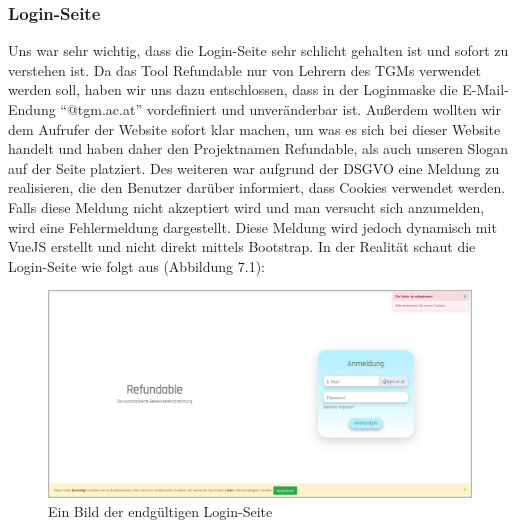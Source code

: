 \subsubsection{Login-Seite}
Uns war sehr wichtig, dass die Login-Seite sehr schlicht gehalten ist und sofort zu verstehen ist. Da das Tool Refundable nur von Lehrern des TGMs verwendet werden soll, haben wir uns dazu entschlossen, dass in der Loginmaske die E-Mail-Endung \enquote{@tgm.ac.at} vordefiniert und unveränderbar ist. Außerdem wollten wir dem Aufrufer der Website sofort klar machen, um was es sich bei dieser Website handelt und haben daher den Projektnamen Refundable, als auch unseren Slogan auf der Seite platziert. Des weiteren war aufgrund der DSGVO eine Meldung zu realisieren, die den Benutzer darüber informiert, dass Cookies verwendet werden. Falls diese Meldung nicht akzeptiert wird und man versucht sich anzumelden, wird eine Fehlermeldung dargestellt. Diese Meldung wird jedoch dynamisch mit VueJS erstellt und nicht direkt mittels Bootstrap. In der Realität schaut die Login-Seite wie folgt aus (Abbildung 7.1):
\begin{figure}[H]
	\centering
	\includegraphics[width=1\linewidth]{images/website/login}
	\caption[Login]{Ein Bild der endgültigen Login-Seite}
	\label{fig:login}
\end{figure}
